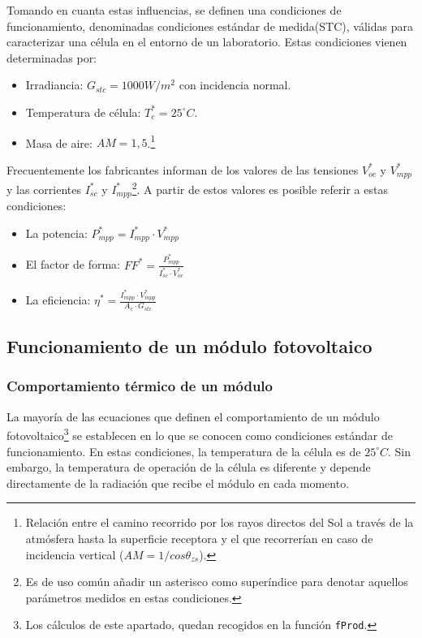 Tomando en cuanta estas influencias, se definen una condiciones de funcionamiento, denominadas condiciones estándar de medida(STC), válidas para caracterizar una célula en el entorno de un laboratorio. Estas condiciones vienen determinadas por:
\begin{itemize}
\item Irradiancia: \(G_{stc}=1000W/m^2\) con incidencia normal.
\item Temperatura de célula: \(T_c^*=25^\circ C\).
\item Masa de aire: \(AM=1,5\).\footnote{Relación entre el camino recorrido por los rayos directos del Sol a través de la atmósfera hasta la superficie receptora y el que recorrerían en caso de incidencia vertical (\(AM=1/cos\theta_{zs}\)).}
\end{itemize}
Frecuentemente los fabricantes informan de los valores de las tensiones \(V_{oc}^*\) y \(V_{mpp}^*\) y las corrientes \(I_{sc}^*\) y \(I_{mpp}^*\)\footnote{Es de uso común añadir un asterisco como superíndice para denotar aquellos parámetros medidos en estas condiciones.}. A partir de estos valores es posible referir a estas condiciones:
\begin{itemize}
\item La potencia: \(P_{mpp}^*=I_{mpp}^*\cdot V_{mpp}^*\)
\item El factor de forma: \(FF^*=\frac{P_{mpp}^*}{I_{sc}^*\cdot V_{oc}^*}\)
\item La eficiencia: \(\eta^*=\frac{I_{mpp}^*\cdot V_{mpp}^*}{A_c\cdot G_{stc}}\)
\end{itemize}

\subsection{Funcionamiento de un módulo fotovoltaico}
\label{sec:org460f70b}
\label{subsec:funcionamiento-modulo-fotovoltaico}
\subsubsection{Comportamiento térmico de un módulo}
\label{sec:org3f01bc8}
La mayoría de las ecuaciones que definen el comportamiento de un módulo fotovoltaico\footnote{Los cálculos de este apartado, quedan recogidos en la función \texttt{fProd}.} se establecen en lo que se conocen como condiciones estándar de funcionamiento. En estas condiciones, la temperatura de la célula es de \(25^\circ C\). Sin embargo, la temperatura de operación de la célula es diferente y depende directamente de la radiación que recibe el módulo en cada momento.

